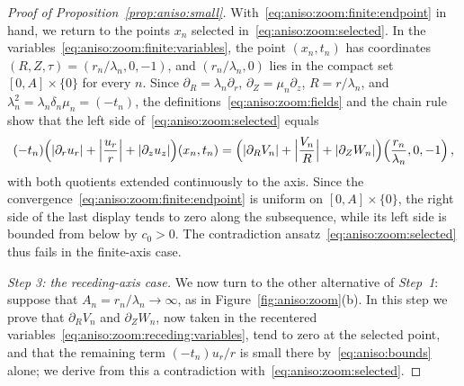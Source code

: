 \documentclass[11pt,reqno]{amsproc}
\numberwithin{equation}{section}
\theoremstyle{remark}
\newcommand{\p}{\partial}
\begin{document}
\begin{proof}[Proof of Proposition~\ref{prop:aniso:small}]
With~\eqref{eq:aniso:zoom:finite:endpoint} in hand, we return to the points $x_n$ selected in~\eqref{eq:aniso:zoom:selected}. In the variables~\eqref{eq:aniso:zoom:finite:variables}, the point $(x_n,t_n)$ has coordinates $(R,Z,\tau)=(r_n/\lambda_n,0,-1)$, and $(r_n/\lambda_n,0)$ lies in the compact set $[0,A]\times\{0\}$ for every $n$. Since $\p_R=\lambda_n\p_r$, $\p_Z=\mu_n\p_z$, $R=r/\lambda_n$, and $\lambda_n^2=\lambda_n\delta_n\mu_n=(-t_n)$, the definitions~\eqref{eq:aniso:zoom:fields} and the chain rule show that the left side of~\eqref{eq:aniso:zoom:selected} equals
\begin{align*}
(-t_n)\Bigl(|\p_ru_r|+\Bigl|\frac{u_r}{r}\Bigr|+|\p_zu_z|\Bigr)(x_n,t_n)
=\Bigl(|\p_RV_n|+\Bigl|\frac{V_n}{R}\Bigr|+|\p_ZW_n|\Bigr)\Bigl(\frac{r_n}{\lambda_n},0,-1\Bigr)
\,,
\end{align*}
with both quotients extended continuously to the axis. Since the convergence~\eqref{eq:aniso:zoom:finite:endpoint} is uniform on $[0,A]\times\{0\}$, the right side of the last display tends to zero along the subsequence, while its left side is bounded from below by $c_0>0$. The contradiction ansatz~\eqref{eq:aniso:zoom:selected} thus fails in the finite-axis case.

\emph{Step 3: the receding-axis case.}
We now turn to the other alternative of \emph{Step~1}: suppose that $A_n=r_n/\lambda_n\to\infty$, as in Figure~\ref{fig:aniso:zoom}(b). In this step we prove that $\p_RV_n$ and $\p_ZW_n$, now taken in the recentered variables~\eqref{eq:aniso:zoom:receding:variables}, tend to zero at the selected point, and that the remaining term $(-t_n)u_r/r$ is small there by~\eqref{eq:aniso:bounds} alone; we derive from this a contradiction with~\eqref{eq:aniso:zoom:selected}.


\end{proof}
\end{document}
